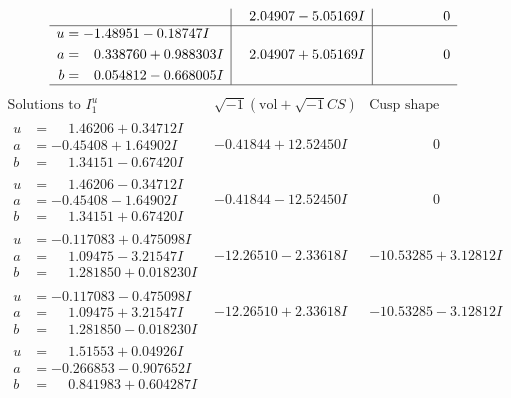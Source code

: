 \documentclass[1p]{elsarticle_modified}
\theoremstyle{definition}
\newcommand{\I}{\sqrt{-1}}
\begin{document}
$$\begin{array}{c|c|c}
 & \phantom{-}2.04907 - 5.05169 I & \phantom{-0.000000 } 0 \\ \hline\begin{aligned}
u &= -1.48951 - 0.18747 I \\
a &= \phantom{-}0.338760 + 0.988303 I \\
b &= \phantom{-}0.054812 - 0.668005 I\end{aligned}
 & \phantom{-}2.04907 + 5.05169 I & \phantom{-0.000000 } 0\\
 \hline 
 \end{array}$$\newpage$$\begin{array}{c|c|c}  
\text{Solutions to }I^u_{1}& \I (\text{vol} + \sqrt{-1}CS) & \text{Cusp shape}\\
 \hline 
\begin{aligned}
u &= \phantom{-}1.46206 + 0.34712 I \\
a &= -0.45408 + 1.64902 I \\
b &= \phantom{-}1.34151 - 0.67420 I\end{aligned}
 & -0.41844 + 12.52450 I & \phantom{-0.000000 } 0 \\ \hline\begin{aligned}
u &= \phantom{-}1.46206 - 0.34712 I \\
a &= -0.45408 - 1.64902 I \\
b &= \phantom{-}1.34151 + 0.67420 I\end{aligned}
 & -0.41844 - 12.52450 I & \phantom{-0.000000 } 0 \\ \hline\begin{aligned}
u &= -0.117083 + 0.475098 I \\
a &= \phantom{-}1.09475 - 3.21547 I \\
b &= \phantom{-}1.281850 + 0.018230 I\end{aligned}
 & -12.26510 - 2.33618 I & -10.53285 + 3.12812 I \\ \hline\begin{aligned}
u &= -0.117083 - 0.475098 I \\
a &= \phantom{-}1.09475 + 3.21547 I \\
b &= \phantom{-}1.281850 - 0.018230 I\end{aligned}
 & -12.26510 + 2.33618 I & -10.53285 - 3.12812 I \\ \hline\begin{aligned}
u &= \phantom{-}1.51553 + 0.04926 I \\
a &= -0.266853 - 0.907652 I \\
b &= \phantom{-}0.841983 + 0.604287 I\end{aligned}

\end{array}$$
\end{document}
